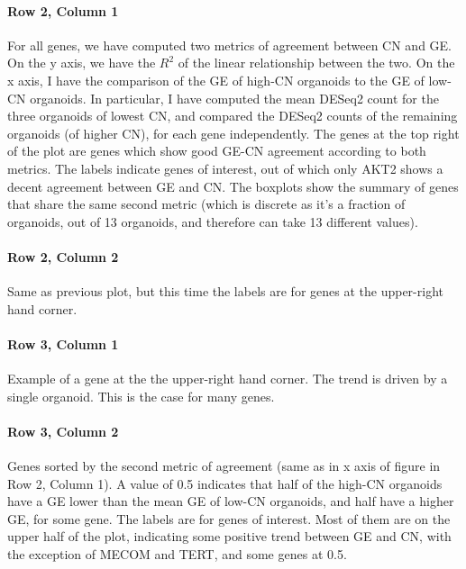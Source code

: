 \documentclass{article}
\begin{document}
\paragraph{Row 2, Column 1} For all genes, we have computed two metrics of agreement between CN and GE. On the y axis, we have the $R^2$ of the linear relationship between the two. On the x axis, I have the comparison of the GE of high-CN organoids to the GE of low-CN organoids. In particular, I have computed the mean DESeq2 count for the three organoids of lowest CN, and compared the DESeq2 counts of the remaining organoids (of higher CN), for each gene independently. The genes at the top right of the plot are genes which show good GE-CN agreement according to both metrics. The labels indicate genes of interest, out of which only AKT2 shows a decent agreement between GE and CN. The boxplots show the summary of genes that share the same second metric (which is discrete as it's a fraction of organoids, out of 13 organoids, and therefore can take 13 different values).

\paragraph{Row 2, Column 2} Same as previous plot, but this time the labels are for genes at the upper-right hand corner.

\paragraph{Row 3, Column 1} Example of a gene at the the upper-right hand corner. The trend is driven by a single organoid. This is the case for many genes.

\paragraph{Row 3, Column 2} Genes sorted by the second metric of agreement (same as in x axis of figure in Row 2, Column 1). A value of 0.5 indicates that half of the high-CN organoids have a GE lower than the mean GE of low-CN organoids, and half have a higher GE, for some gene. The labels are for genes of interest. Most of them are on the upper half of the plot, indicating some positive trend between GE and CN, with the exception of MECOM and TERT, and some genes at 0.5.
\end{document}
